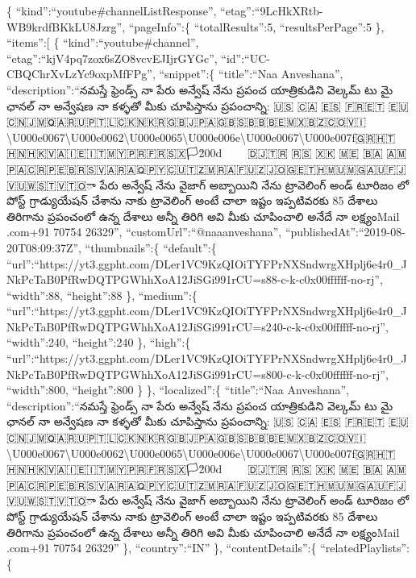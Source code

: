 \documentclass[11pt]{article}
\begin{document}
\{ ``kind'':``youtube\#channelListResponse'',
``etag'':``9LcHkXRtb-WB9krdfBKkLU8Jzrg'', ``pageInfo'':\{
``totalResults'':5, ``resultsPerPage'':5 \}, ``items'':{[} \{
``kind'':``youtube\#channel'', ``etag'':``kjV4pq7zox6sZO8vcvEJIjrGYGc'',
``id'':``UC-CBQChrXvLzYc9oxpMfFPg'', ``snippet'':\{ ``title'':``Naa
Anveshana'', ``description'':``నమస్తే ఫ్రెండ్స్ నా పేరు అన్వేష్ నేను
ప్రపంచ యాత్రికుడిని వెల్కమ్ టు మై ఛానల్ నా అన్వేషణ నా కళ్ళతో మీకు
చూపిస్తాను ప్రపంచాన్ని\n\nCounting : 🇺🇸 🇨🇦 🇪🇸 🇫🇷🇪🇹
🇪🇺🇨🇳🇯🇲🇶🇦🇷🇺🇵🇹🇱🇨🇰🇳🇰🇷🇬🇧🇯🇵🇦🇬🇧🇸🇧🇧🇧🇪🇲🇽🇧🇿🇨🇴🇻🇮🏴\textbackslash U000e0067\textbackslash U000e0062\textbackslash U000e0065\textbackslash U000e006e\textbackslash U000e0067\textbackslash U000e007f🇬🇷🇭🇹🇭🇳🇭🇰🇻🇦🇮🇪🇮🇹🇲🇾🇵🇷🇫🇷🇸🇽🏳️\u200d🌈🇰🇳🇦🇪🇸🇴
🇩🇯🇹🇷 🇷🇸 🇽🇰 🇲🇪 🇧🇦
🇦🇲🇵🇦🇨🇷🇵🇪🇧🇷🇸🇻🇦🇷🇦🇶🇵🇾🇨🇺🇹🇿🇲🇷🇦🇫🇺🇿🇯🇴🇬🇪🇹🇭🇲🇺🇲🇬🇦🇺🇫🇯🇻🇺🇼🇸🇹🇻🇹🇴\n{}ా పేరు అన్వేష్
నేను వైజాగ్ అబ్బాయిని నేను ట్రావెలింగ్ అండ్ టూరిజం లో పోస్ట్
గ్రాడ్యుయేషన్ చేశాను నాకు ట్రావెలింగ్ అంటే చాలా ఇష్టం ఇప్పటివరకు 85
దేశాలు తిరిగాను ప్రపంచంలో ఉన్న దేశాలు అన్నీ తిరిగి అవి మీకు చూపించాలి
అనేదే నా లక్ష్యం\n\n\nMy Mail \nNaaAnveshanaaa@gmail.com\n+91 70754
26329'', ``customUrl'':``@naaanveshana'',
``publishedAt'':``2019-08-20T08:09:37Z'', ``thumbnails'':\{
``default'':\{
``url'':``https://yt3.ggpht.com/DLer1VC9KzQIOiTYFPrNXSndwrgXHplj6e4r0\_JNkPcTaB0PfRwDQTPGWhhXoA12JiSGi991rCU=s88-c-k-c0x00ffffff-no-rj'',
``width'':88, ``height'':88 \}, ``medium'':\{
``url'':``https://yt3.ggpht.com/DLer1VC9KzQIOiTYFPrNXSndwrgXHplj6e4r0\_JNkPcTaB0PfRwDQTPGWhhXoA12JiSGi991rCU=s240-c-k-c0x00ffffff-no-rj'',
``width'':240, ``height'':240 \}, ``high'':\{
``url'':``https://yt3.ggpht.com/DLer1VC9KzQIOiTYFPrNXSndwrgXHplj6e4r0\_JNkPcTaB0PfRwDQTPGWhhXoA12JiSGi991rCU=s800-c-k-c0x00ffffff-no-rj'',
``width'':800, ``height'':800 \} \}, ``localized'':\{ ``title'':``Naa
Anveshana'', ``description'':``నమస్తే ఫ్రెండ్స్ నా పేరు అన్వేష్ నేను
ప్రపంచ యాత్రికుడిని వెల్కమ్ టు మై ఛానల్ నా అన్వేషణ నా కళ్ళతో మీకు
చూపిస్తాను ప్రపంచాన్ని\n\nCounting : 🇺🇸 🇨🇦 🇪🇸 🇫🇷🇪🇹
🇪🇺🇨🇳🇯🇲🇶🇦🇷🇺🇵🇹🇱🇨🇰🇳🇰🇷🇬🇧🇯🇵🇦🇬🇧🇸🇧🇧🇧🇪🇲🇽🇧🇿🇨🇴🇻🇮🏴\textbackslash U000e0067\textbackslash U000e0062\textbackslash U000e0065\textbackslash U000e006e\textbackslash U000e0067\textbackslash U000e007f🇬🇷🇭🇹🇭🇳🇭🇰🇻🇦🇮🇪🇮🇹🇲🇾🇵🇷🇫🇷🇸🇽🏳️\u200d🌈🇰🇳🇦🇪🇸🇴
🇩🇯🇹🇷 🇷🇸 🇽🇰 🇲🇪 🇧🇦
🇦🇲🇵🇦🇨🇷🇵🇪🇧🇷🇸🇻🇦🇷🇦🇶🇵🇾🇨🇺🇹🇿🇲🇷🇦🇫🇺🇿🇯🇴🇬🇪🇹🇭🇲🇺🇲🇬🇦🇺🇫🇯🇻🇺🇼🇸🇹🇻🇹🇴\n{}ా పేరు అన్వేష్
నేను వైజాగ్ అబ్బాయిని నేను ట్రావెలింగ్ అండ్ టూరిజం లో పోస్ట్
గ్రాడ్యుయేషన్ చేశాను నాకు ట్రావెలింగ్ అంటే చాలా ఇష్టం ఇప్పటివరకు 85
దేశాలు తిరిగాను ప్రపంచంలో ఉన్న దేశాలు అన్నీ తిరిగి అవి మీకు చూపించాలి
అనేదే నా లక్ష్యం\n\n\nMy Mail \nNaaAnveshanaaa@gmail.com\n+91 70754
26329'' \}, ``country'':``IN'' \}, ``contentDetails'':\{
``relatedPlaylists'':\{
\end{document}
